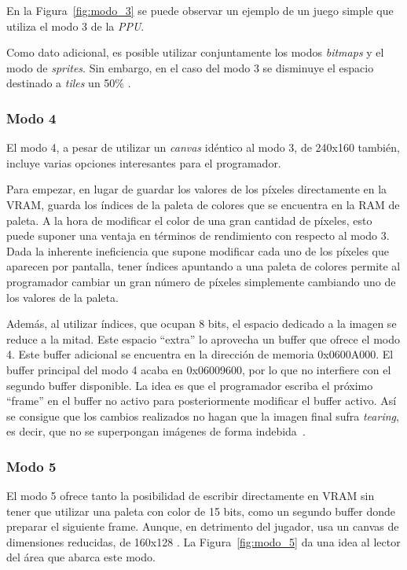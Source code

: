 En la Figura~\ref{fig:modo_3} se puede observar un ejemplo de un juego simple que utiliza el modo 3 de la \textit{PPU}.

Como dato adicional, es posible utilizar conjuntamente los modos \textit{bitmaps} y el modo de \textit{sprites}. Sin embargo, en el caso del modo 3 se disminuye el espacio destinado a \textit{tiles} un 50\% \cite{bib:tonc}.

\subsubsection{Modo 4}\label{sec:mode_4}
El modo 4, a pesar de utilizar un \textit{canvas} idéntico al modo 3, de 240x160 también, incluye varias opciones interesantes para el programador.

Para empezar, en lugar de guardar los valores de los píxeles directamente en la VRAM, guarda los índices de la paleta de colores que se encuentra en la RAM de paleta. A la hora de modificar el color de una gran cantidad de píxeles, esto puede suponer una ventaja en términos de rendimiento con respecto al modo 3. Dada la inherente ineficiencia que supone modificar cada uno de los píxeles que aparecen por pantalla, tener índices apuntando a una paleta de colores permite al programador cambiar un gran número de píxeles simplemente cambiando uno de los valores de la paleta.

Además, al utilizar índices, que ocupan 8 bits, el espacio dedicado a la imagen se reduce a la mitad. Este espacio ``extra'' lo aprovecha un buffer que ofrece el modo 4. Este buffer adicional se encuentra en la dirección de memoria 0x0600A000. El buffer principal del modo 4 acaba en 0x06009600, por lo que no interfiere con el segundo buffer disponible. La idea es que el programador escriba el próximo ``frame'' en el buffer no activo para posteriormente modificar el buffer activo. Así se consigue que los cambios realizados no hagan que la imagen final sufra \textit{tearing}, es decir, que no se superpongan imágenes de forma indebida~\cite{bib:gba_manual,bib:tonc}.

\subsubsection{Modo 5}\label{sec:mode_5}
El modo 5 ofrece tanto la posibilidad de escribir directamente en VRAM sin tener que utilizar una paleta con color de 15 bits, como un segundo buffer donde preparar el siguiente frame. Aunque, en detrimento del jugador, usa un canvas de dimensiones reducidas, de 160x128 \cite{bib:gba_manual}. La Figura~\ref{fig:modo_5} da una idea al lector del área que abarca este modo.

